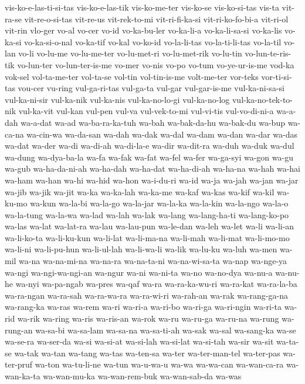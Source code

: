 {vis-ko-e-las-ti-si-tas vis-ko-e-las-tik vis-ko-me-ter vis-ko-se
vis-ko-si-tas vis-ta vit-ra-se vit-re-o-si-tas vit-re-us vit-rek-to-mi
vit-ri-fi-ka-si vit-ri-ko-fo-bi-a vit-ri-ol vit-rin vlo-ger vo-al vo-cer
vo-id vo-ka-bu-ler vo-ka-li-a vo-ka-li-sa-si vo-ka-lis vo-ka-si
vo-ka-si-o-nal vo-ka-tif vo-kal vo-ko-id vo-la-li-tas vo-la-ti-li-tas
vo-la-til vo-lan vo-li vo-lu-me vo-lu-me-ter vo-lu-met-ri vo-lu-met-rik
vo-lu-tin vo-lun-te-ris-tik vo-lun-ter vo-lun-ter-is-me vo-mer vo-nis
vo-po vo-tum vo-ye-ur-is-me vod-ka vok-sel vol-ta-me-ter vol-ta-se vol-tin
vol-tin-is-me volt-me-ter vor-teks vor-ti-si-tas vou-cer vu-ring
vul-ga-ri-tas vul-ga-ta vul-gar vul-gar-is-me vul-ka-ni-sa-si
vul-ka-ni-sir vul-ka-nik vul-ka-nis vul-ka-no-lo-gi vul-ka-no-log
vul-ka-no-tek-to-nik vul-ka-vit vul-kan vul-pen vul-va vul-vek-to-mi
vul-vi-tis vul-vo-di-ni-a wa-a-dah wa-a-dat wa-ad wa-ba-ra-ka-tuh wa-bah
wa-bak-da-hu wa-bak-du wa-bup wa-ca-na wa-cin-wa wa-da-san wa-dah wa-dak
wa-dal wa-dam wa-dan wa-dar wa-das wa-dat wa-der wa-di wa-di-ah wa-di-la-e
wa-dir wa-dit-ra wa-duh wa-duk wa-dul wa-dung wa-dya-ba-la wa-fa wa-fak
wa-fat wa-fel wa-fer wa-ga-syi wa-gon wa-gu wa-gub wa-ha-da-ni-ah
wa-ha-dah wa-ha-dat wa-ha-di-ah wa-ha-na wa-hah wa-hai wa-ham wa-han wa-hi
wa-hid wa-hon wa-i-du-ri wa-id wa-ja wa-jah wa-jan wa-jar wa-jib wa-jik
wa-jit wa-ka wa-ka-lah wa-ka-me wa-kaf wa-kas wa-kif wa-kil wa-ku-mo
wa-kun wa-la-bi wa-la-go wa-la-jar wa-la-ka wa-la-kin wa-la-ngo wa-la-o
wa-la-tung wa-la-wa wa-lad wa-lah wa-lak wa-lang wa-lang-ha-ti
wa-lang-ko-po wa-las wa-lat wa-lat-ra wa-lau wa-lau-pun wa-le-dan wa-leh
wa-let wa-li wa-li-an wa-li-ko-ta wa-li-ku-kun wa-li-lat wa-li-ma-na
wa-li-mah wa-li-mat wa-li-mo-mo wa-li-ni wa-li-pu-hun wa-li-ul-lah
wa-li-wa-li wa-lik wa-lu-ku wa-luh wa-men wa-mil wa-na wa-na-mi-na
wa-na-ra wa-na-ta-ni wa-na-wi-sa-ta wa-nap wa-nge-ya wa-ngi
wa-ngi-wa-ngi-an wa-ngur wa-ni wa-ni-ta wa-no wa-no-dya wa-nu-a wa-nu-he
wa-nyi wa-pa-ngab wa-pres wa-qaf wa-ra wa-ra-ka-wu-ri wa-ra-kat
wa-ra-la-ba wa-ra-ngan wa-ra-sah wa-ra-wa-ra wa-ra-wi-ri wa-rah-an wa-rak
wa-rang-ga-na wa-rang-ka wa-ras wa-rem wa-ri wa-ri-a wa-ri-bo wa-ri-ga
wa-ri-ngin wa-ri-ta wa-rid wa-rik wa-ring wa-ris wa-ris-an wa-rok wa-ru
wa-ru-ga wa-ru-na wa-rung wa-rung-an wa-sa-bi wa-sa-lam wa-sa-na
wa-sa-ti-ah wa-sak wa-sal wa-sang-ka wa-se wa-se-ra wa-ser-da wa-si
wa-si-at wa-si-lah wa-si-lat wa-si-tah wa-sir wa-sit wa-ta-se wa-tak
wa-tan wa-tang wa-tas wa-ten-sa wa-ter wa-ter-man-tel wa-ter-pas
wa-ter-pruf wa-ton wa-tu-li-ne wa-tun wa-u-wa-u wa-wa wa-wa-can
wa-wan-ca-ra wa-wan-ka-ta wa-wan-mu-ka wa-wan-rem-buk wa-wan-sab-da wa-was
}

